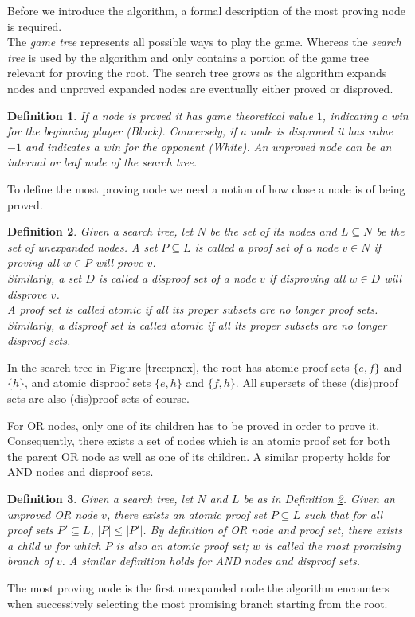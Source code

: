 \documentclass[a4paper, 11pt]{article}
\newtheorem{mydef}{Definition}
\begin{document}
Before we introduce the algorithm, a formal description of the most proving node is required.\\
The \textit{game tree} represents all possible ways to play the game. Whereas the \textit{search tree} is used by the algorithm
and only contains a portion of the game tree relevant for proving the root. The search tree grows as the algorithm expands nodes and
unproved expanded nodes are eventually either proved or disproved.
\begin{mydef}
If a node is proved it has game theoretical value $1$, indicating a win for the beginning player (Black).
Conversely, if a node is disproved it has value $-1$ and indicates a win for the opponent (White).
An unproved node can be an internal or leaf node of the search tree.
\end{mydef}

To define the most proving node we need a notion of how close a node is of being proved.
\begin{mydef}
Given a search tree, let $N$ be the set of its nodes and $L \subseteq N$ be the set of unexpanded nodes. A set $P \subseteq L$ is called a proof set of a node $v \in N$ if proving all $w \in P$ will prove $v$.\\
Similarly, a set $D$ is called a disproof set of a node $v$ if disproving all $w \in D$ will disprove $v$.\\
A proof set is called atomic if all its proper subsets are no longer proof sets.\\
Similarly, a disproof set is called atomic if all its proper subsets are no longer disproof sets.
\label{def:pset}
\end{mydef}
In the search tree in Figure \ref{tree:pnex}, the root has atomic proof sets $\{e, f\}$ and $\{h\}$,
and atomic disproof sets $\{e, h\}$ and $\{f, h\}$. All supersets of these (dis)proof sets are also (dis)proof sets of course.

For OR nodes, only one of its children has to be proved in order to prove it. Consequently, there exists a set of nodes which is an atomic
proof set for both the parent OR node as well as one of its children. A similar property holds for AND nodes and disproof sets.
\begin{mydef}
Given a search tree, let $N$ and $L$ be as in Definition \ref{def:pset}.
Given an unproved OR node $v$, there exists an atomic proof set $P \subseteq L$ such that for all proof sets $P' \subseteq L$, $|P| \leq |P'|$.
By definition of OR node and proof set, there exists a child $w$ for which $P$ is also an atomic proof set; $w$ is called the most promising branch
of $v$. A similar definition holds for AND nodes and disproof sets.
\end{mydef}
The most proving node is the first unexpanded node the algorithm encounters when successively selecting the most promising branch starting from
the root.
\end{document}

